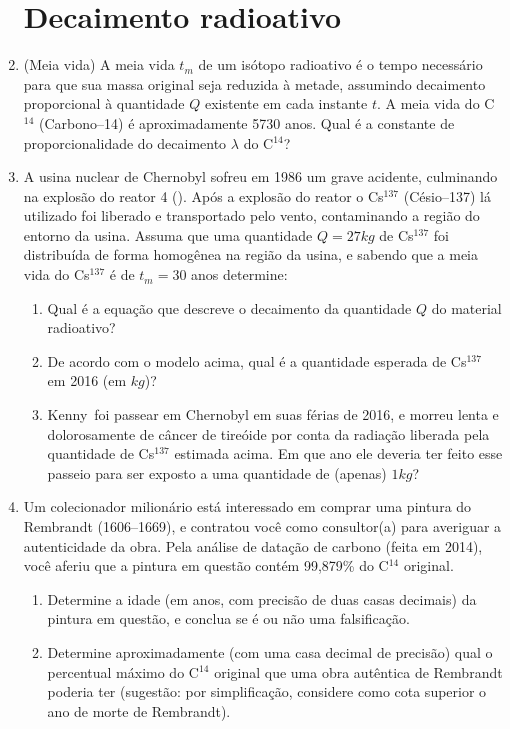\documentclass[a4paper]{article}
\begin{document}
\begin{enumerate}
\section{Decaimento radioativo}

\item (Meia vida) A meia vida $t_m$ de um isótopo radioativo é o tempo
  necessário para que sua massa original seja reduzida à metade,
  assumindo decaimento proporcional à quantidade $Q$ existente em cada
  instante $t$. A meia vida do C$^{14}$ (Carbono--14) é
  aproximadamente 5730 anos. Qual é a constante de proporcionalidade
  do decaimento $\lambda$ do C$^{14}$?


\item A usina nuclear de Chernobyl sofreu em 1986 um grave acidente,
  culminando na explosão do reator 4 (\cite{Chernobyl1,
    Chernobyl2}). Após a explosão do reator o Cs$^{137}$ (Césio--137)
  lá utilizado foi liberado e transportado pelo vento, contaminando a
  região do entorno da usina. Assuma que uma quantidade $Q=27kg$ de
  Cs$^{137}$ foi distribuída de forma homogênea na região da usina, e
  sabendo que a meia vida do Cs$^{137}$ é de $t_m=30$ anos determine:

  \begin{enumerate}
  \item Qual é a equação que descreve o decaimento da quantidade $Q$
    do material radioativo?
  \item De acordo com o modelo acima, qual é a quantidade esperada de
    Cs$^{137}$ em 2016 (em $kg$)?
  \item Kenny\circledR\ foi passear em Chernobyl em suas férias de
    2016, e morreu lenta e dolorosamente de câncer de tireóide por
    conta da radiação liberada pela quantidade de Cs$^{137}$ estimada
    acima. Em que ano ele deveria ter feito esse passeio para ser
    exposto a uma quantidade de (apenas) $1kg$?
  \end{enumerate}

\item Um colecionador milionário está interessado em comprar uma
  pintura do Rembrandt (1606--1669), e contratou você como
  consultor(a) para averiguar a autenticidade da obra. Pela análise de
  datação de carbono (feita em 2014), você aferiu que a pintura em
  questão contém 99,879\% do C$^{14}$ original.

  \begin{enumerate}
  \item Determine a idade (em anos, com precisão de duas casas
    decimais) da pintura em questão, e conclua se é ou não uma
    falsificação.
  \item Determine aproximadamente (com uma casa decimal de precisão)
    qual o percentual máximo do C$^{14}$ original que uma obra
    autêntica de Rembrandt poderia ter (sugestão: por simplificação,
    considere como cota superior o ano de morte de Rembrandt).
  \end{enumerate}
\end{enumerate}
\end{document}
